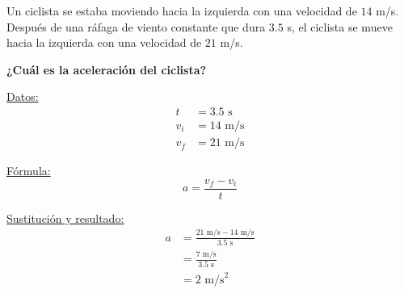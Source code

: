 \question[20] Un ciclista se estaba moviendo hacia la izquierda con una velocidad de $14$ m/s. Después de una ráfaga 
de viento constante que dura $3.5$ s, el ciclista se mueve hacia la izquierda con una velocidad de $21$ m/s.

\textbf{¿Cuál es la aceleración del ciclista?}

\begin{minipage}[c]{\linewidth}
    \begin{solutionbox}{4.5cm}
        \begin{minipage}[t]{0.3\textwidth}
            \centering
            \underline{Datos:}
            \begin{align*}
                t   & =  3.5 \text{ s}  \\
                v_i & = 14  \text{ m/s} \\
                v_f & = 21  \text{ m/s}
            \end{align*}
        \end{minipage}%
        \begin{minipage}[t]{0.3\textwidth}
            \centering
            \underline{F\'ormula:}
            \begin{equation*}
                a=\frac{v_f-v_i}{t}
            \end{equation*}
        \end{minipage}
        \begin{minipage}[t]{0.3\textwidth}
            \centering
            \underline{Sustituci\'on y resultado:}
            \begin{align*}
                a & =\frac{21 \text{ m/s}-14 \text{ m/s}}{3.5 \text{ s}} \\
                  & = \frac{7 \text{ m/s}}{3.5 \text{ s}}             \\
                  & =2 \text{ m/s}^2
            \end{align*}
        \end{minipage}
    \end{solutionbox}
\end{minipage}